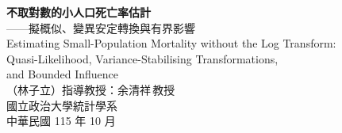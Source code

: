 \documentclass[UTF8, fontset=macnew, a4paper, 12pt]{ctexart}
\begin{document}

\begin{center}
{\bfseries 不取對數的小人口死亡率估計}\\[4pt]
{ ——擬概似、變異安定轉換與有界影響}\\[6pt]
{ Estimating Small-Population Mortality without the Log Transform:}\\[2pt]
{ Quasi-Likelihood, Variance-Stabilising Transformations,}\\[2pt]
{ and Bounded Influence}\\[12pt]
{ （林子立）\quad 指導教授：余清祥\,教授}\\[4pt]
{ 國立政治大學統計學系}\\[4pt]
{ 中華民國 115 年 10 月}
\end{center}
\end{document}
